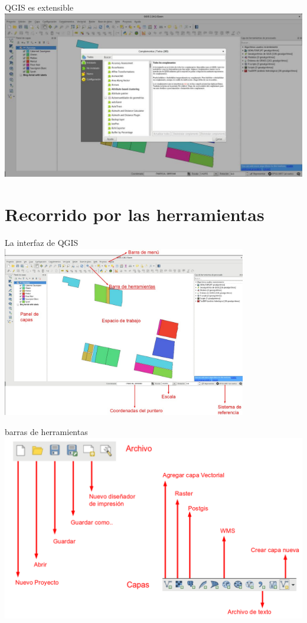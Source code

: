 \documentclass{beamer}
\begin{document}
\begin{frame}{QGIS es extensible}
	\centering
	\includegraphics[width=1\textwidth]{QGIS-plugins}
\end{frame}



\section{Recorrido por las herramientas}

\begin{frame}{La interfaz de QGIS}
	\centering
	\includegraphics[width=0.8\textwidth]{interfaz}
\end{frame}

\begin{frame}{barras de herramientas}
	\centering
	\includegraphics[width=1\textwidth]{tb1}
\end{frame}
\end{document}
